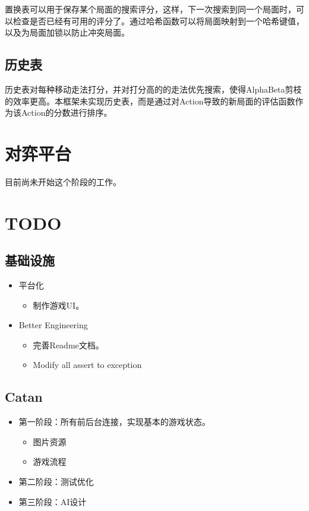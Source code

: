 \documentclass[export, 12pt, letterpaper]{ctexrep}
\begin{document}
置换表可以用于保存某个局面的搜索评分，这样，下一次搜索到同一个局面时，可以检查是否已经有可用的评分了。通过哈希函数可以将局面映射到一个哈希键值，以及为局面加锁以防止冲突局面。

\section{历史表}

历史表对每种移动走法打分，并对打分高的的走法优先搜索，使得AlphaBeta剪枝的效率更高。本框架未实现历史表，而是通过对Action导致的新局面的评估函数作为该Action的分数进行排序。

\chapter{对弈平台}

目前尚未开始这个阶段的工作。

\chapter{TODO}

\section{基础设施}


\begin{itemize}
\item{ 平台化
\begin{itemize}
\item{ 制作游戏UI。 }
\end{itemize}
 }
\item{ Better Engineering
\begin{itemize}
\item{ 完善Readme文档。 }
\item{ Modify all assert to exception }
\end{itemize}
 }
\end{itemize}


\section{Catan}

\begin{itemize}
\item{ 第一阶段：所有前后台连接，实现基本的游戏状态。
\begin{itemize}
\item{ 图片资源 }
\item{ 游戏流程 }
\end{itemize}
 }
\item{ 第二阶段：测试优化 }
\item{ 第三阶段：AI设计 }
\end{itemize}
\end{document}
